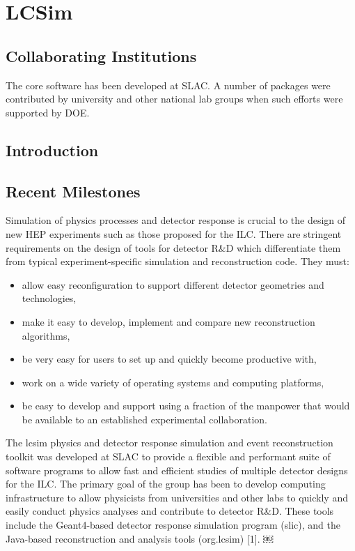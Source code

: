 \section{LCSim}
\subsection{Collaborating Institutions}

The core software has been developed at SLAC. A number of packages were
contributed by university and other national lab groups when such efforts were
supported by DOE.

\subsection{Introduction}
\subsection{Recent Milestones}

Simulation of physics processes and detector response is crucial to the design
of new HEP experiments such as those proposed for the ILC. There are stringent
requirements on the design of tools for detector R&D which differentiate them
from typical experiment-specific simulation and reconstruction code. They must:
\begin{itemize}
\item allow easy reconfiguration to support different detector geometries and technologies,
\item make it easy to develop, implement and compare new reconstruction algorithms,
\item be very easy for users to set up and quickly become productive with,
\item work on a wide variety of operating systems and computing platforms,
\item be easy to develop and support using a fraction of the manpower that would be available to an established experimental collaboration.
\end{itemize}
The lcsim physics and detector response simulation and event reconstruction
toolkit was developed at SLAC to provide a flexible and performant suite of
software programs to allow fast and efficient studies of multiple detector
designs for the ILC. The primary goal of the group has been to develop computing
infrastructure to allow physicists from universities and other labs to quickly
and easily conduct physics analyses and contribute to detector R&D. These tools
include the Geant4-based detector response simulation program (slic), and the
Java-based reconstruction and analysis tools (org.lcsim) [1].
￼
